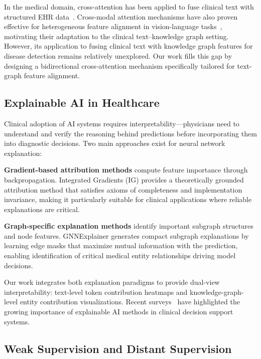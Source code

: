 \documentclass[11pt,onecolumn,a4paper]{article}
\begin{document}
In the medical domain, cross-attention has been applied to fuse clinical text with structured EHR data~\cite{song2018attend}. Cross-modal attention mechanisms have also proven effective for heterogeneous feature alignment in vision-language tasks~\cite{chen2020cross}, motivating their adaptation to the clinical text--knowledge graph setting. However, its application to fusing clinical text with knowledge graph features for disease detection remains relatively unexplored. Our work fills this gap by designing a bidirectional cross-attention mechanism specifically tailored for text-graph feature alignment.

\subsection{Explainable AI in Healthcare}

Clinical adoption of AI systems requires interpretability---physicians need to understand and verify the reasoning behind predictions before incorporating them into diagnostic decisions. Two main approaches exist for neural network explanation:

\textbf{Gradient-based attribution methods} compute feature importance through backpropagation. Integrated Gradients (IG) \cite{sundararajan2017} provides a theoretically grounded attribution method that satisfies axioms of completeness and implementation invariance, making it particularly suitable for clinical applications where reliable explanations are critical.

\textbf{Graph-specific explanation methods} identify important subgraph structures and node features. GNNExplainer \cite{ying2019gnnexplainer} generates compact subgraph explanations by learning edge masks that maximize mutual information with the prediction, enabling identification of critical medical entity relationships driving model decisions.

Our work integrates both explanation paradigms to provide dual-view interpretability: text-level token contribution heatmaps and knowledge-graph-level entity contribution visualizations. Recent surveys~\cite{chen2024explainable} have highlighted the growing importance of explainable AI methods in clinical decision support systems.

\subsection{Weak Supervision and Distant Supervision}
\end{document}
